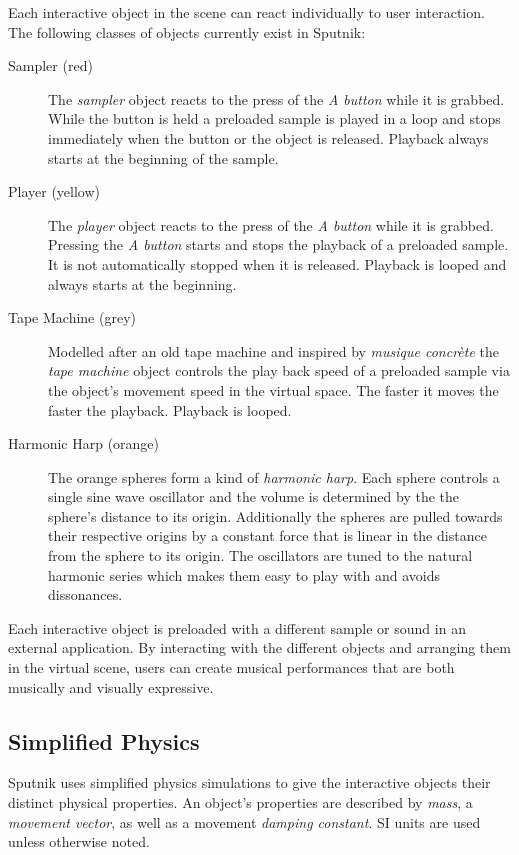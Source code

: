 \documentclass[10pt,a4paper]{scrartcl}
\begin{document}
Each interactive object in the scene can react individually to user interaction. The following classes of objects currently exist in Sputnik:

\begin{description}
\item[Sampler (red)] The \emph{sampler} object reacts to the press of the \emph{A button} while it is grabbed. While the button is held a preloaded sample is played in a loop and stops immediately when the button or the object is released. Playback always starts at the beginning of the sample.

\item[Player (yellow)] The \emph{player} object reacts to the press of the \emph{A button} while it is grabbed. Pressing the \emph{A button} starts and stops the playback of a preloaded sample. It is not automatically stopped when it is released. Playback is looped and always starts at the beginning.

\item[Tape Machine (grey)] Modelled after an old tape machine and inspired by \emph{musique concrète} the \emph{tape machine} object controls the play back speed of a preloaded sample via the object's movement speed in the virtual space. The faster it moves the faster the playback. Playback is looped.

\item[Harmonic Harp (orange)] The orange spheres form a kind of \emph{harmonic harp}. Each sphere controls a single sine wave oscillator and the volume is determined by the the sphere's distance to its origin. Additionally the spheres are pulled towards their respective origins by a constant force that is linear in the distance from the sphere to its origin. The oscillators are tuned to the natural harmonic series which makes them easy to play with and avoids dissonances.
\end{description}

Each interactive object is preloaded with a different sample or sound in an external application. By interacting with the different objects and arranging them in the virtual scene, users can create musical performances that are both musically and visually expressive.


\subsection{Simplified Physics}
Sputnik uses simplified physics simulations to give the interactive objects their distinct physical properties. An object's properties are described by \emph{mass}, a \emph{movement vector}, as well as a movement \emph{damping constant}. SI units are used unless otherwise noted.
\end{document}
